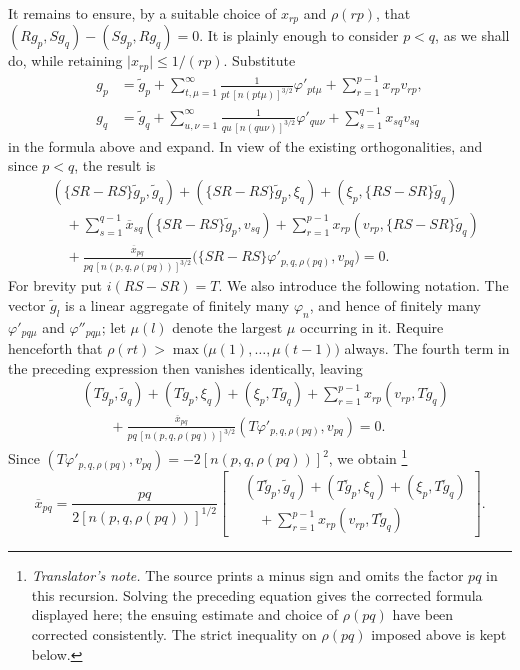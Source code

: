 \documentclass[
  paper=b5,
  twoside=true,
  fontsize=13pt,
  headings=normal,
  bookmarkpackage=false
]{scrartcl}
\theoremstyle{definition}
\newcounter{translatornote}
\newcounter{savedfootnote}
\newcommand{\TranslatorNote}[1]{%
  \stepcounter{translatornote}%
  \setcounter{savedfootnote}{\value{footnote}}%
  \begingroup
    \renewcommand{\thefootnote}{T\arabic{translatornote}}%
    \footnote{\textit{Translator's note.} #1}%
  \endgroup
  \setcounter{footnote}{\value{savedfootnote}}}
\begin{document}
It remains to ensure, by a suitable choice of \(x_{rp}\) and
\(\rho(rp)\), that \((Rg_p,Sg_q)-(Sg_p,Rg_q)=0\). It is plainly enough to consider \(p<q\), as we shall do, while retaining
\(\lvert x_{rp}\rvert\leq1/(rp)\).  Substitute
\begin{align*}
  g_p
  &=
  \widetilde g_p
  +
  \sum_{t,\mu=1}^{\infty}
  \frac{1}{pt\,[n(pt\mu)]^{3/2}}\varphi'_{pt\mu}
  +
  \sum_{r=1}^{p-1}x_{rp}v_{rp},\\
  g_q
  &=
  \widetilde g_q
  +
  \sum_{u,\nu=1}^{\infty}
  \frac{1}{qu\,[n(qu\nu)]^{3/2}}\varphi'_{qu\nu}
  +
  \sum_{s=1}^{q-1}x_{sq}v_{sq}
\end{align*}
in the formula above and expand.  In view of the existing
orthogonalities, and since \(p<q\), the result is
\begin{align*}
  &(\{SR-RS\}\widetilde g_p,\widetilde g_q)
  +(\{SR-RS\}\widetilde g_p,\xi_q)
  +(\xi_p,\{RS-SR\}\widetilde g_q)\\
  &\quad+
  \sum_{s=1}^{q-1}\overline{x}_{sq}
  (\{SR-RS\}\widetilde g_p,v_{sq})
  +
  \sum_{r=1}^{p-1}x_{rp}
  (v_{rp},\{RS-SR\}\widetilde g_q)\\
  &\quad+
  \frac{\overline{x}_{pq}}
  {pq\,[n(p,q,\rho(pq))]^{3/2}}
  \bigl(\{SR-RS\}\varphi'_{p,q,\rho(pq)},v_{pq}\bigr)
  =0.
\end{align*}
For brevity put \(i(RS-SR)=T\). We also introduce the following notation.  The vector
\(\widetilde g_l\) is a linear aggregate of finitely many
\(\varphi_n\), and hence of finitely many
\(\varphi'_{pq\mu}\) and \(\varphi''_{pq\mu}\); let \(\mu(l)\) denote the
largest \(\mu\) occurring in it. Require henceforth that
\(\rho(rt)>\max\bigl(\mu(1),\ldots,\mu(t-1)\bigr)\) always.  The fourth term in the preceding expression then vanishes
identically, leaving
\begin{align*}
  &(T\widetilde g_p,\widetilde g_q)
  +(T\widetilde g_p,\xi_q)
  +(\xi_p,T\widetilde g_q)
  +\sum_{r=1}^{p-1}x_{rp}(v_{rp},T\widetilde g_q)\\
  &\qquad+
  \frac{\overline{x}_{pq}}
  {pq\,[n(p,q,\rho(pq))]^{3/2}}
  (T\varphi'_{p,q,\rho(pq)},v_{pq})
  =0.
\end{align*}
Since \((T\varphi'_{p,q,\rho(pq)},v_{pq})=-2[n(p,q,\rho(pq))]^{2}\),
we obtain\TranslatorNote{The source prints a minus sign and omits the
factor \(pq\) in this recursion.  Solving the preceding equation gives
the corrected formula displayed here; the ensuing estimate and choice
of \(\rho(pq)\) have been corrected consistently. The strict
inequality on \(\rho(pq)\) imposed above is kept below.}
\[
  \overline{x}_{pq}
  =
  \frac{pq}{2[n(p,q,\rho(pq))]^{1/2}}
  \left[
  \begin{aligned}
    &(T\widetilde g_p,\widetilde g_q)
    +(T\widetilde g_p,\xi_q)
    +(\xi_p,T\widetilde g_q)\\
    &\quad+
    \sum_{r=1}^{p-1}x_{rp}(v_{rp},T\widetilde g_q)
  \end{aligned}
  \right].
\]
\end{document}
